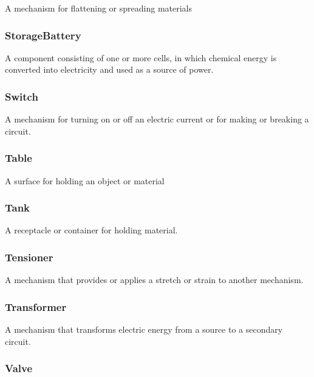 A mechanism for flattening or spreading materials


\subsubsection{StorageBattery}
\label{sec:StorageBattery}



A component consisting of one or more cells, in which chemical energy is converted into electricity and used as a source of power. 


\subsubsection{Switch}
\label{sec:Switch}



A mechanism for turning on or off an electric current or for making or breaking a circuit.


\subsubsection{Table}




A surface for holding an object or material


\subsubsection{Tank}
\label{sec:Tank}



A receptacle or container for holding material.


\subsubsection{Tensioner}
\label{sec:Tensioner}



A mechanism that provides or applies a stretch or strain to another mechanism.


\subsubsection{Transformer}
\label{sec:Transformer}



A mechanism that transforms electric energy from a source to a secondary circuit.


\subsubsection{Valve}
\label{sec:Valve}



